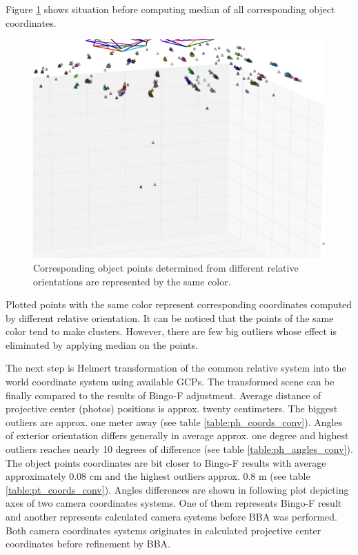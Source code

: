 \documentclass[a4paper,12pt]{article}
\begin{document}

Figure \ref{fig:rel_or_points} shows situation before computing median of all corresponding object coordinates.

\begin{center}
 \begin{figure}[!h]
    \includegraphics[scale=0.4]{figures/before_median.png}
    \caption{Corresponding object points determined from different relative orientations are represented by the same color.}
    \label{fig:rel_or_points}
\end{figure}
\end{center}

Plotted points with the same color represent corresponding coordinates computed by different relative orientation. It can be noticed that 
the points of the same color tend to make clusters. However, there are few big outliers whose effect is eliminated by applying
median on the points.

The next step is Helmert transformation of the common relative system into the world coordinate system using available GCPs.
The transformed scene can be finally compared to the results of Bingo-F adjustment.
Average distance of projective center (photos) positions is approx. twenty centimeters. 
The  biggest  outliers are approx. one meter away  
(see table \ref{table:ph_coords_conv}). Angles of exterior orientation differs  generally in average approx. one degree and 
highest outliers reaches nearly 10 degrees of difference (see table \ref{table:ph_angles_conv}). 
The object points coordinates 
are bit closer to Bingo-F results with average approximately 0.08 cm and the highest outliers approx. 0.8 m (see table \ref{table:pt_coords_conv}). 
Angles differences are shown in following plot depicting axes of two camera coordinates systems. One of them represents 
Bingo-F result and another represents
 calculated camera systems before BBA was performed. Both camera coordinates systems originates in calculated projective center coordinates
  before refinement by BBA.
    
\end{document}
